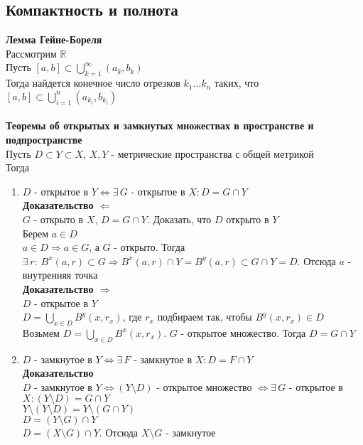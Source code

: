 \documentclass[12pt]{article}
\begin{document}
\subsection{Компактность и полнота}
\textbf{Лемма Гейне-Бореля}\\
Рассмотрим $\mathbb{R}$\\
Пусть $[a,b] \subset \bigcup_{k=1}^\infty (a_k,b_k)$\\
Тогда найдется конечное число отрезков $k_1\ldots k_n$ таких, что $[a,b] \subset \bigcup_{i=1}^n (a_{k_i}, b_{k_i})$\\\\
\textbf{Теоремы об открытых и замкнутых множествах в пространстве и подпространстве}\\
Пусть $D \subset Y \subset X$, $X,Y$ - метрические пространства с общей метрикой\\
Тогда
\begin{enumerate}
    \item $D$ - открытое в $Y \Leftrightarrow \exists\,G$ - открытое в $X: D=G\cap Y$\\
    \textbf{Доказательство $\Leftarrow$}\\
    $G$ - открыто в $X$, $D = G\cap Y$. Доказать, что $D$ открыто в $Y$\\
    Берем $a\in D$\\
    $a \in D \Rightarrow a \in G$, а $G$ - открыто. Тогда $\exists\,r:\ B^x(a,r) \subset G \Rightarrow B^x(a,r)\cap Y = B^y(a,r) \subset G\cap Y = D$. Отсюда $a$ - внутренняя точка\\
    \textbf{Доказательство $\Rightarrow$}\\
    $D$ - открытое в $Y$\\
    $D=\bigcup_{x\in D} B^y(x,r_x)$, где $r_x$ подбираем так, чтобы $B^y(x,r_x) \in D$\\
    Возьмем $D=\bigcup_{x\in D} B^x(x,r_x)$. $G$ - открытое множество. Тогда $D = G\cap Y$
    \item $D$ - замкнутое в $Y \Leftrightarrow \exists\,F$ - замкнутое в $X: D=F\cap Y$\\
    \textbf{Доказательство}\\
    $D$ - замкнутое в $Y \Leftrightarrow (Y\setminus D)$ - открытое множество $\Leftrightarrow \exists\,G$ - открытое в $X: (Y\setminus D) = G\cap Y$\\
    $Y\setminus(Y\setminus D) = Y\setminus(G\cap Y)$\\
    $D = (Y\setminus G)\cap Y$\\
    $D = (X\setminus G) \cap Y$. Отсюда $X \setminus G$ - замкнутое
\end{enumerate}
\end{document}
